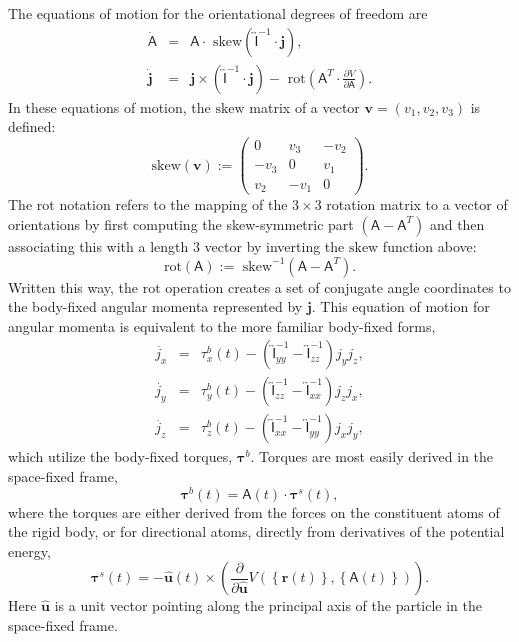 \documentclass[letterpaper]{report}
\begin{document}
The equations of motion for the orientational degrees of freedom are
\begin{eqnarray}
\dot{\mathsf{A}} & = & \mathsf{A} \cdot
\mbox{ skew}\left(\overleftrightarrow{\mathsf{I}}^{-1} \cdot \mathbf{j}\right),\\
\dot{\mathbf{j}} & = & \mathbf{j} \times \left( \overleftrightarrow{\mathsf{I}}^{-1}
\cdot \mathbf{j} \right) - \mbox{ rot}\left(\mathsf{A}^{T} \cdot \frac{\partial
V}{\partial \mathsf{A}} \right).
\end{eqnarray}
In these equations of motion, the $\mbox{skew}$ matrix of a vector
$\mathbf{v} = \left( v_1, v_2, v_3 \right)$ is defined:
\begin{equation}
\mbox{skew}\left( \mathbf{v} \right) := \left( 
\begin{array}{ccc}
0 & v_3 & - v_2 \\
-v_3 & 0 & v_1 \\
v_2 & -v_1 & 0 
\end{array}
\right).
\end{equation}
The $\mbox{rot}$ notation refers to the mapping of the $3 \times 3$
rotation matrix to a vector of orientations by first computing the
skew-symmetric part $\left(\mathsf{A} - \mathsf{A}^{T}\right)$ and
then associating this with a length 3 vector by inverting the
$\mbox{skew}$ function above:
\begin{equation}
\mbox{rot}\left(\mathsf{A}\right) := \mbox{ skew}^{-1}\left(\mathsf{A}
- \mathsf{A}^{T} \right).
\end{equation}
Written this way, the $\mbox{rot}$ operation creates a set of
conjugate angle coordinates to the body-fixed angular momenta
represented by $\mathbf{j}$.  This equation of motion for angular momenta
is equivalent to the more familiar body-fixed forms,
\begin{eqnarray}
\dot{j_{x}} & = & \tau^b_x(t)  -
\left(\overleftrightarrow{\mathsf{I}}_{yy}^{-1} - \overleftrightarrow{\mathsf{I}}_{zz}^{-1} \right) j_y j_z, \\
\dot{j_{y}} & = & \tau^b_y(t) -
\left(\overleftrightarrow{\mathsf{I}}_{zz}^{-1} - \overleftrightarrow{\mathsf{I}}_{xx}^{-1} \right) j_z j_x,\\
\dot{j_{z}} & = & \tau^b_z(t) -
\left(\overleftrightarrow{\mathsf{I}}_{xx}^{-1} - \overleftrightarrow{\mathsf{I}}_{yy}^{-1} \right) j_x j_y, 
\end{eqnarray}
which utilize the body-fixed torques, $\mathbf{\tau}^b$. Torques are
most easily derived in the space-fixed frame, 
\begin{equation}
\mathbf{\tau}^b(t) = \mathsf{A}(t) \cdot \mathbf{\tau}^s(t),
\end{equation}
where the torques are either derived from the forces on the
constituent atoms of the rigid body, or for directional atoms,
directly from derivatives of the potential energy,
\begin{equation}
\mathbf{\tau}^s(t) = - \hat{\mathbf{u}}(t) \times \left( \frac{\partial}
{\partial \hat{\mathbf{u}}} V\left(\left\{ \mathbf{r}(t) \right\}, \left\{
\mathsf{A}(t) \right\}\right) \right).
\end{equation}
Here $\hat{\mathbf{u}}$ is a unit vector pointing along the principal axis
of the particle in the space-fixed frame.
\end{document}
